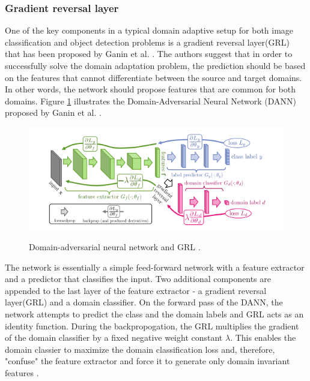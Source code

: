 \documentclass[english, 12pt, a4paper, elec, utf8, a-1b, online]{aaltothesis}
\begin{document}
\subsubsection{Gradient reversal layer}

One of the key components in a typical domain adaptive setup for both image classification and object detection problems is a gradient reversal layer(GRL) that has been proposed by Ganin et al. \cite{Ganin2015}. The authors suggest that in order to successfully solve the domain adaptation problem, the prediction should be based on the features that cannot differentiate between the source and target domains. In other words, the network should propose features that are common for both domains. Figure \ref{DANN} illustrates the Domain-Adversarial Neural Network (DANN) proposed by Ganin et al. \cite{Ganin2015}. 

\begin{figure}[htb]
	\begin{center}
		\includegraphics[width=16cm]{./GRL.png}
	\end{center}
	\caption{Domain-adversarial neural network and GRL \cite{Ganin2015}.}
	\begin{center}
		\label{DANN}
	\end{center}
\end{figure}
\FloatBarrier

The network is essentially a simple feed-forward network with a feature extractor and a predictor that classifies the input. Two additional components are appended to the last layer of the feature extractor - a gradient reversal layer(GRL) and a domain classifier. On the forward pass of the DANN, the network attempts to predict the class and the domain labels and GRL acts as an identity function. During the backpropogation, the GRL multiplies the gradient of the domain classifier by a fixed negative weight constant $\lambda$. This enables the domain classier to maximize the domain classification loss and, therefore, "confuse" the feature extractor and force it to generate only domain invariant features \cite{Ganin2015}. 
\end{document}
